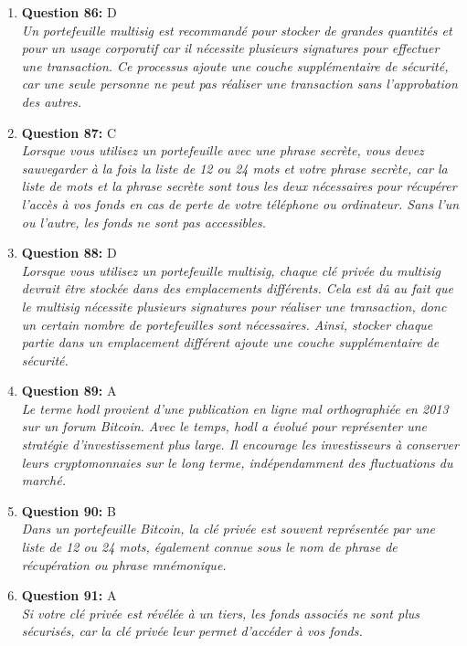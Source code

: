 \documentclass[12pt,a4paper]{article}
\begin{document}
\begin{enumerate}
\item \textbf{Question 86:} D
\\ \textit{Un portefeuille multisig est recommandé pour stocker de grandes quantités et pour un usage corporatif car il nécessite plusieurs signatures pour effectuer une transaction. Ce processus ajoute une couche supplémentaire de sécurité, car une seule personne ne peut pas réaliser une transaction sans l'approbation des autres.}

\item \textbf{Question 87:} C
\\ \textit{Lorsque vous utilisez un portefeuille avec une phrase secrète, vous devez sauvegarder à la fois la liste de 12 ou 24 mots et votre phrase secrète, car la liste de mots et la phrase secrète sont tous les deux nécessaires pour récupérer l'accès à vos fonds en cas de perte de votre téléphone ou ordinateur. Sans l'un ou l'autre, les fonds ne sont pas accessibles.}

\item \textbf{Question 88:} D
\\ \textit{Lorsque vous utilisez un portefeuille multisig, chaque clé privée du multisig devrait être stockée dans des emplacements différents. Cela est dû au fait que le multisig nécessite plusieurs signatures pour réaliser une transaction, donc un certain nombre de portefeuilles sont nécessaires. Ainsi, stocker chaque partie dans un emplacement différent ajoute une couche supplémentaire de sécurité.}

\item \textbf{Question 89:} A
\\ \textit{Le terme hodl provient d'une publication en ligne mal orthographiée en 2013 sur un forum Bitcoin. Avec le temps, hodl a évolué pour représenter une stratégie d'investissement plus large. Il encourage les investisseurs à conserver leurs cryptomonnaies sur le long terme, indépendamment des fluctuations du marché.}

\item \textbf{Question 90:} B
\\ \textit{Dans un portefeuille Bitcoin, la clé privée est souvent représentée par une liste de 12 ou 24 mots, également connue sous le nom de phrase de récupération ou phrase mnémonique.}

\item \textbf{Question 91:} A
\\ \textit{Si votre clé privée est révélée à un tiers, les fonds associés ne sont plus sécurisés, car la clé privée leur permet d'accéder à vos fonds.}


\end{enumerate}
\end{document}
